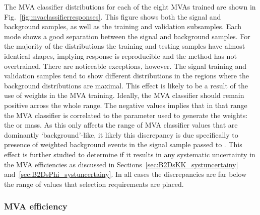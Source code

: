 The MVA classifier distributions for each of the eight MVAs trained are shown in Fig.~\ref{fig:mvaclassifierresponses}. This figure shows both the signal and background samples, as well as the training and validation subsamples. Each mode shows a good separation between the signal and background samples. For the majority of the distributions the training and testing samples have almost identical shapes, implying response is reproducible and the method has not overtrained. There are noticeable exceptions, however. The signal training and validation samples tend to show different distributions in the regions where the background distributions are maximal. This effect is likely to be a result of the use of weights in the MVA training. Ideally, the MVA classifier should remain positive across the whole range. The negative values implies that in that range the MVA classifier is correlated to the parameter used to generate the weights: the \phiz or \Dsp mass. As this only affects the range of MVA classifier values that are dominantly `background'-like, it likely this discrepancy is due specifically to presence of weighted background events in the signal sample passed to \tmva.
This effect is further studied to determine if it results in any systematic uncertainty in the MVA efficiencies as discussed in Sections~\ref{sec:B2DsKK_systuncertainy} and~\ref{sec:B2DsPhi_systuncertainy}. In all cases the discrepancies are far below the range of values that selection requirements are placed. 


\subsubsection{MVA efficiency}
\label{sec:selection_MVA_eff}


